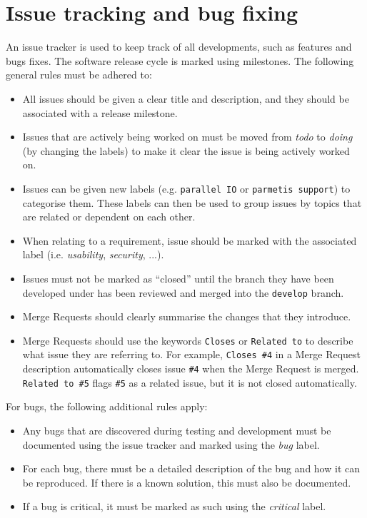 \documentclass[11pt]{report}
\begin{document}
\section{Issue tracking and bug fixing}
An issue tracker is used to keep track of all developments, such as features and bugs fixes. The software release cycle is marked using 
milestones. The following general rules must be adhered to:

\begin{itemize}
  \item All issues should be given a clear title and description, and they should be associated with a release milestone.
  \item Issues that are actively being worked on must be moved from \emph{todo} to \emph{doing} (by changing the labels) to make it clear the issue is
  being actively worked on.
  \item Issues can be given new labels (e.g. \texttt{parallel IO} or \texttt{parmetis support}) to categorise them. These labels can then be used to group 
  issues by topics that are related or dependent on each other.
  \item When relating to a requirement, issue should be marked with the associated label (i.e. \emph{usability}, \emph{security}, ...).
  \item Issues must not be marked as ``closed'' until the branch they have been developed under has been reviewed and merged into 
  the \texttt{develop} branch.
  \item Merge Requests should clearly summarise the changes that they introduce.
  \item Merge Requests should use the keywords \texttt{Closes} or \texttt{Related to} to describe what issue they are referring to. 
  For example, \texttt{Closes \#4} in a Merge Request description automatically closes issue \texttt{\#4} when the Merge Request 
  is merged. \texttt{Related to \#5} flags \texttt{\#5} as a related issue, but it is not closed automatically. 
\end{itemize}

For bugs, the following additional rules apply:

\begin{itemize}
  \item Any bugs that are discovered during testing and development must be documented using the issue tracker and marked using the \emph{bug} label.
  \item For each bug, there must be a detailed description of the bug and how it can be reproduced. If there is a known solution, this must also
  be documented.
  \item If a bug is critical, it must be marked as such using the \emph{critical} label.
\end{itemize}
\end{document}
